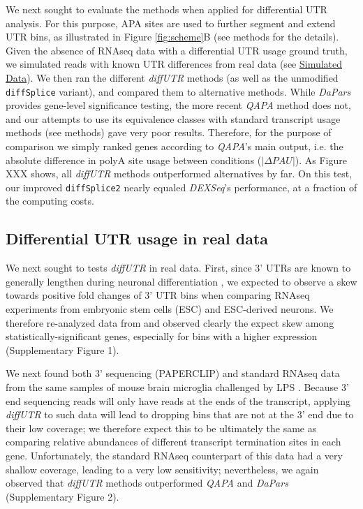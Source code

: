 \documentclass{bmcart}
\begin{document}
We next sought to evaluate the methods when applied for differential UTR analysis. For this purpose, APA sites are used to further segment and extend UTR bins, as illustrated in Figure \ref{fig:scheme}B (see methods for the details). Given the absence of RNAseq data with a differential UTR usage ground truth, we simulated reads with known UTR differences from real data (see \hyperref[sec:sim]{Simulated Data}). We then ran the different \textit{diffUTR} methods (as well as the unmodified \texttt{diffSplice} variant), and compared them to alternative methods. While \textit{DaPars} \cite{Xia2014DynamicTypes} provides gene-level significance testing, the more recent \textit{QAPA} method \cite{Ha2018QAPA:Data} does not, and our attempts to use its equivalence classes with standard transcript usage methods (see methods) gave very poor results. Therefore, for the purpose of comparison we simply ranked genes according to \textit{QAPA}'s main output, i.e. the absolute difference in polyA site usage between conditions ($|\Delta PAU|$). As Figure XXX shows, all \textit{diffUTR} methods outperformed alternatives by far. On this test, our improved \texttt{diffSplice2} nearly equaled \textit{DEXSeq}'s performance, at a fraction of the computing costs. 

\subsection*{Differential UTR usage in real data}

We next sought to tests \textit{diffUTR} in real data. First, since 3' UTRs are known to generally lengthen during neuronal differentiation \cite{Blair2017WidespreadDifferentiation,Ha2018QAPA:Data}, we expected to observe a skew towards positive fold changes of 3' UTR bins when comparing RNAseq experiments from embryonic stem cells (ESC) and ESC-derived neurons. We therefore re-analyzed data from \cite{WhippleImprinted2020} and observed clearly the expect skew among statistically-significant genes, especially for bins with a higher expression (Supplementary Figure 1).

We next found both 3' sequencing (PAPERCLIP) and standard RNAseq data from the same samples of mouse brain microglia challenged by LPS  \cite{Hwang2017CTag-PAPERCLIPActivation}. Because 3' end sequencing reads will only have reads at the ends of the transcript, applying \textit{diffUTR} to such data will lead to dropping bins that are not at the 3' end due to their low coverage; we therefore expect this to be ultimately the same as comparing relative abundances of different transcript termination sites in each gene. Unfortunately, the standard RNAseq counterpart of this data had a very shallow coverage, leading to a very low sensitivity; nevertheless, we again observed that \textit{diffUTR} methods outperformed \textit{QAPA} and \textit{DaPars} (Supplementary Figure 2).
\end{document}
